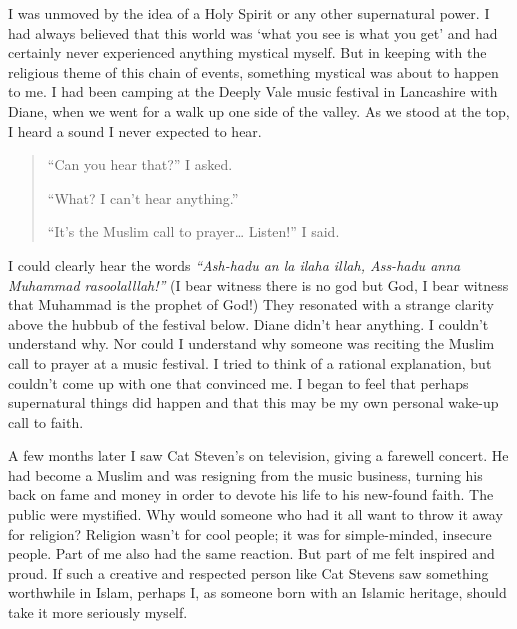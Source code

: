 \documentclass[12pt]{memoir}
\begin{document}
I was unmoved by the idea of a Holy Spirit or any other supernatural power.
I had always believed that this world was ‘what you see is what you get’
and had certainly never experienced anything mystical myself.
But in keeping with the religious theme of this chain of events,
something mystical was about to happen to me.
I had been camping at the Deeply Vale music festival in Lancashire with Diane,
when we went for a walk up one side of the valley.
As we stood at the top, I heard a sound I never expected to hear.

\begin{quote}
“Can you hear that?” I asked.

“What? I can’t hear anything.”

“It’s the Muslim call to prayer… Listen!” I said.
\end{quote}

I could clearly hear the words
\emph{“Ash-hadu an la ilaha illah, Ass-hadu anna Muhammad rasoolalllah!”}
(I bear witness there is no god but God, I bear witness
that Muhammad is the prophet of God!)
They resonated with a strange clarity above the hubbub of the festival below.
Diane didn’t hear anything.
I couldn’t understand why.
Nor could I understand why someone was reciting
the Muslim call to prayer at a music festival.
I tried to think of a rational explanation,
but couldn’t come up with one that convinced me.
I began to feel that perhaps supernatural things did happen
and that this may be my own personal wake-up call to faith.

A few months later I saw Cat Steven’s on television,
giving a farewell concert.
He had become a Muslim and was resigning from the music business,
turning his back on fame and money
in order to devote his life to his new-found faith.
The public were mystified. Why would someone
who had it all want to throw it away for religion?
Religion wasn’t for cool people; it was for simple-minded, insecure people.
Part of me also had the same reaction.
But part of me felt inspired and proud.
If such a creative and respected person like Cat Stevens
saw something worthwhile in Islam, perhaps I,
as someone born with an Islamic heritage,
should take it more seriously myself.
\end{document}
